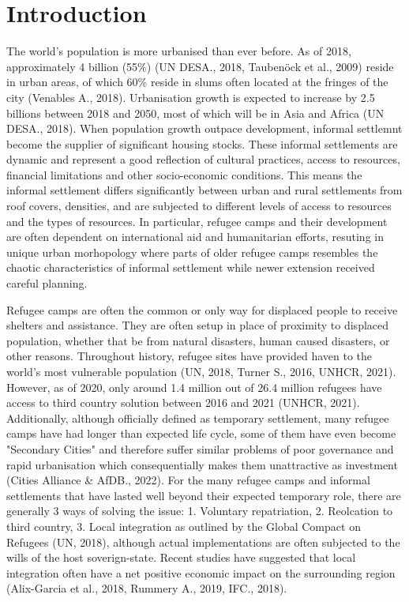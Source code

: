 \documentclass[11pt, a4paper, twoside]{report}
\begin{document}
\newpage
\pagestyle{fancy}
\chapter{Introduction}\label{Intro}

The world’s population is more urbanised than ever before. As of 2018, approximately 4 billion (55\%) (UN DESA., 2018, Taubenöck et al., 2009) reside in urban areas, of which 60\% reside in slums often located at the fringes of the city (Venables A., 2018). Urbanisation growth is expected to increase by 2.5 billions between 2018 and 2050, most of which will be in Asia and Africa (UN DESA., 2018). When population growth outpace development, informal settlemnt become the supplier of significant housing stocks. These informal settlements are dynamic and represent a good reflection of cultural practices, access to resources, financial limitations and other socio-economic conditions. This means the informal settlement differs significantly between urban and rural settlements from roof covers, densities, and are subjected to different levels of access to resources and the types of resources. In particular, refugee camps and their development are often dependent on international aid and humanitarian efforts, resuting in unique urban morhopology where parts of older refugee camps resembles the chaotic characteristics of informal settlement while newer extension received careful planning.\\\par

Refugee camps are often the common or only way for displaced people to receive shelters and assistance. They are often setup in place of proximity to displaced population, whether that be from natural disasters, human caused disasters, or other reasons. Throughout history, refugee sites have provided haven to the world's most vulnerable population (UN, 2018, Turner S., 2016, UNHCR, 2021). However, as of 2020, only around 1.4 million out of 26.4 million refugees have access to third country solution between 2016 and 2021 (UNHCR, 2021). Additionally, although officially defined as temporary settlement, many refugee camps have had longer than expected life cycle, some of them have even become "Secondary Cities" and therefore suffer similar problems of poor governance and rapid urbanisation which consequentially makes them unattractive as investment (Cities Alliance \& AfDB., 2022). For the many refugee camps and informal settlements that have lasted well beyond their expected temporary role, there are  generally 3 ways of solving the issue: 1. Voluntary repatriation, 2. Reolcation to third country, 3. Local integration as outlined by the Global Compact on Refugees (UN, 2018), although actual implementations are often subjected to the wills of the host soverign-state. Recent studies have suggested that local integration often have a net positive economic impact on the surrounding region (Alix-Garcia et al., 2018, Rummery A., 2019, IFC., 2018). \\\par
\end{document}
